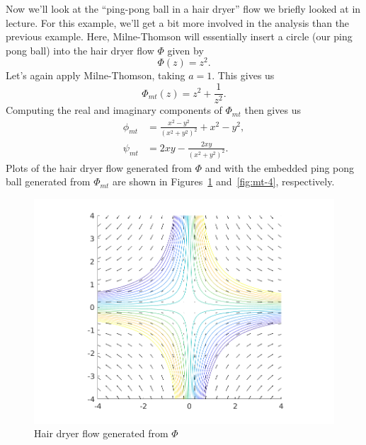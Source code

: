 \documentclass{article}
\begin{document}
Now we'll look at the ``ping-pong ball in a hair dryer'' flow we briefly
looked at in lecture. For this example, we'll get a bit more involved in
the analysis than the previous example. Here, Milne-Thomson will
essentially insert a circle (our ping pong ball) into the hair dryer
flow $\Phi$ given by
%
\begin{equation*}
    \Phi(z) = z^2
    .
\end{equation*}
%
Let's again apply Milne-Thomson, taking $a = 1$. This gives us
%
\begin{equation*}
    \Phi_{mt}(z) = z^2 + \frac{1}{z^2}
    .
\end{equation*}
%
Computing the real and imaginary components of $\Phi_{mt}$ then gives us
%
\begin{align*}
    \phi_{mt} &= \frac{x^2 - y^2}{(x^2 + y^2)^2} + x^2 - y^2, \\
    \psi_{mt} &= 2 x y - \frac{2 x y}{(x^2 + y^2)^2}
    .
\end{align*}
%
Plots of the hair dryer flow generated from $\Phi$ and with the embedded
ping pong ball generated from $\Phi_{mt}$ are shown in
Figures~\ref{fig:mt-3} and~\ref{fig:mt-4}, respectively.
%
\begin{figure}[ht]
    \includegraphics[width=35em]{mt_ex2_1}
    \centering
    \caption{Hair dryer flow generated from $\Phi$}
    \label{fig:mt-3}
\end{figure}
%
\end{document}
